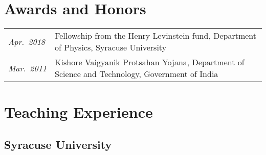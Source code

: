 \documentclass[10pt]{article}
\newcommand{\bname}{\underline{Manu Mannattil}} %
\begin{document}




\section*{Awards and Honors}

\begin{tabular}{@{}ll}
  \emph{Apr.~2018} & Fellowship from the Henry Levinstein fund, Department of Physics, Syracuse University\\
  \emph{Mar.~2011} & Kishore Vaigyanik Protsahan Yojana, Department of Science and Technology, Government of India
\end{tabular}


\section*{Teaching Experience}

\subsection*{Syracuse University}
\end{document}
